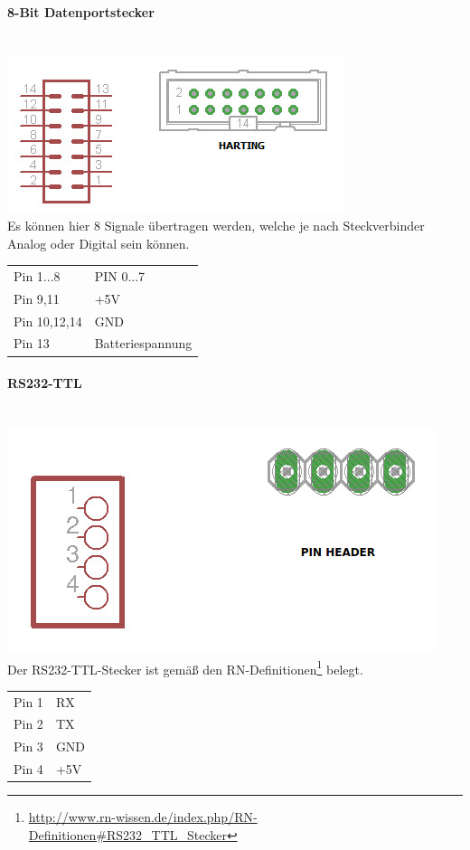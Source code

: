 \documentclass[a4paper,10pt]{article}
\begin{document}
\paragraph{8-Bit Datenportstecker} \mbox{} \\
\includegraphics[scale=0.6]{connector_8-bit} \\
Es können hier 8 Signale übertragen werden, welche je nach Steckverbinder Analog oder Digital sein können.
\begin{center}
    \begin{tabular}{| l | l |}
    \hline
    Pin 1...8 	& PIN 0...7 \\ 
    Pin 9,11	& +5V \\
    Pin 10,12,14& GND \\ 
    Pin 13 	& Batteriespannung \\ \hline
    \end{tabular}
\end{center}

\paragraph{RS232-TTL} \mbox{} \\
\includegraphics[scale=0.6]{connector_rs232-ttl} \\
Der RS232-TTL-Stecker ist gemäß den RN-Definitionen\footnote{\url{http://www.rn-wissen.de/index.php/RN-Definitionen\#RS232_TTL_Stecker}} belegt.
\begin{center}
    \begin{tabular}{| l | l |}
    \hline
    Pin 1 	& RX \\ 
    Pin 2	& TX \\
    Pin 3	& GND \\ 
    Pin 4 	& +5V \\ \hline
    \end{tabular}
\end{center}
\end{document}
